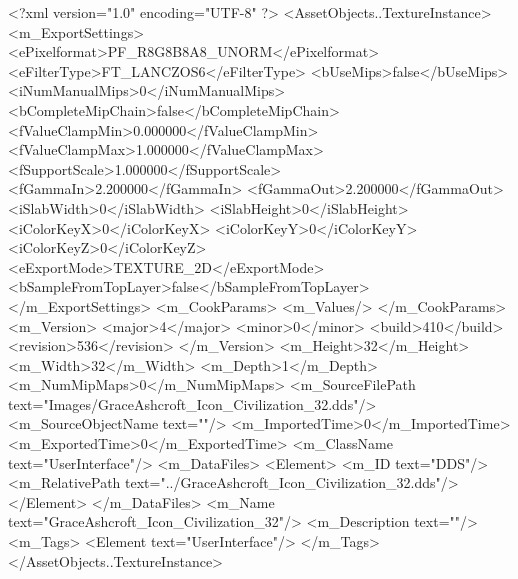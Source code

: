<?xml version="1.0" encoding="UTF-8" ?>
<AssetObjects..TextureInstance>
	<m_ExportSettings>
		<ePixelformat>PF_R8G8B8A8_UNORM</ePixelformat>
		<eFilterType>FT_LANCZOS6</eFilterType>
		<bUseMips>false</bUseMips>
		<iNumManualMips>0</iNumManualMips>
		<bCompleteMipChain>false</bCompleteMipChain>
		<fValueClampMin>0.000000</fValueClampMin>
		<fValueClampMax>1.000000</fValueClampMax>
		<fSupportScale>1.000000</fSupportScale>
		<fGammaIn>2.200000</fGammaIn>
		<fGammaOut>2.200000</fGammaOut>
		<iSlabWidth>0</iSlabWidth>
		<iSlabHeight>0</iSlabHeight>
		<iColorKeyX>0</iColorKeyX>
		<iColorKeyY>0</iColorKeyY>
		<iColorKeyZ>0</iColorKeyZ>
		<eExportMode>TEXTURE_2D</eExportMode>
		<bSampleFromTopLayer>false</bSampleFromTopLayer>
	</m_ExportSettings>
	<m_CookParams>
		<m_Values/>
	</m_CookParams>
	<m_Version>
		<major>4</major>
		<minor>0</minor>
		<build>410</build>
		<revision>536</revision>
	</m_Version>
	<m_Height>32</m_Height>
	<m_Width>32</m_Width>
	<m_Depth>1</m_Depth>
	<m_NumMipMaps>0</m_NumMipMaps>
	<m_SourceFilePath text="Images/GraceAshcroft_Icon_Civilization_32.dds"/>
	<m_SourceObjectName text=""/>
	<m_ImportedTime>0</m_ImportedTime>
	<m_ExportedTime>0</m_ExportedTime>
	<m_ClassName text="UserInterface"/>
	<m_DataFiles>
		<Element>
			<m_ID text="DDS"/>
			<m_RelativePath text="../GraceAshcroft_Icon_Civilization_32.dds"/>
		</Element>
	</m_DataFiles>
	<m_Name text="GraceAshcroft_Icon_Civilization_32"/>
	<m_Description text=""/>
	<m_Tags>
		<Element text="UserInterface"/>
	</m_Tags>
</AssetObjects..TextureInstance>
